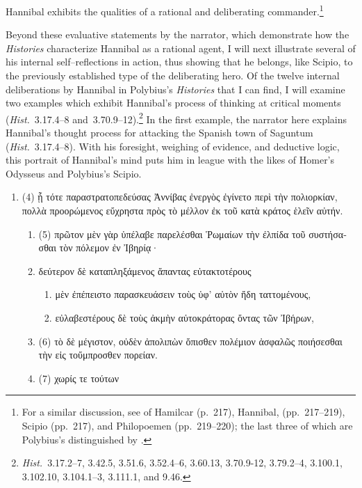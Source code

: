 \documentclass[12pt,letterpaper,oneside,final]{memoir}
\begin{document}
Hannibal exhibits the qualities of a rational and deliberating commander.\footnote{For a similar discussion, see \textcite[216--220]{pedech1964} of Hamilcar (p.~217), Hannibal, (pp.~217--219), Scipio (pp.~217), and Philopoemen (pp.~219--220); the last three of which are Polybius's  distinguished by .} 

Beyond these evaluative statements by the narrator, which demonstrate how the \emph{Histories} characterize Hannibal as a rational agent, I will next illustrate several of his internal self--reflections in action, thus showing  that he belongs, like Scipio, to the previously established type of the deliberating hero. Of the twelve internal deliberations by Hannibal in Polybius's \emph{Histories} that I can find, I will examine two examples which exhibit Hannibal's process of thinking at critical moments (\emph{Hist.}~3.17.4--8 and~3.70.9--12).\footnote{\emph{Hist.}~3.17.2--7, 3.42.5, 3.51.6, 3.52.4--6, 3.60.13, 3.70.9-12, 3.79.2--4, 3.100.1, 3.102.10, 3.104.1--3, 3.111.1, and 9.46.} In the first example, the narrator here explains Hannibal's thought process for attacking the Spanish town of Saguntum (\emph{Hist.}~3.17.4--8). With his foresight, weighing of evidence, and deductive logic, this portrait of Hannibal's mind puts him in league with the likes of Homer's Odysseus and Polybius's Scipio. \begin{greek} \begin{enumerate} \SingleSpacing 
\item (4) ᾗ τότε παραστρατοπεδεύσας Ἀννίβας ἐνεργὸς ἐγίνετο περὶ τὴν πολιορκίαν, πολλὰ προορώμενος εὔχρηστα πρὸς τὸ μέλλον ἐκ τοῦ κατὰ κράτος ἑλεῖν αὐτήν. 
  \begin{enumerate}
  \item (5) πρῶτον μὲν γὰρ ὑπέλαβε παρελέσθαι Ῥωμαίων τὴν ἐλπίδα τοῦ συστήσασθαι τὸν πόλεμον ἐν Ἰβηρίᾳ· 
  \item δεύτερον δὲ καταπληξάμενος ἅπαντας εὐτακτοτέρους 
    \begin{enumerate}
    \item μὲν ἐπέπειστο παρασκευάσειν τοὺς ὑφ' αὐτὸν ἤδη ταττομένους, 
    \item εὐλαβεστέρους δὲ τοὺς ἀκμὴν αὐτοκράτορας ὄντας τῶν Ἰβήρων,
    \end{enumerate}
  \item (6) τὸ δὲ μέγιστον, οὐδὲν ἀπολιπὼν ὄπισθεν πολέμιον ἀσφαλῶς ποιήσεσθαι τὴν εἰς τοὔμπροσθεν πορείαν. 
  \item (7) χωρίς τε τούτων 

\end{enumerate}
\end{enumerate}
\end{greek}
\end{document}
